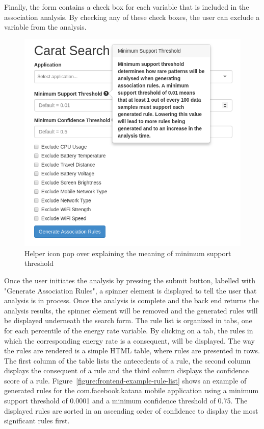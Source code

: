 Finally, the form contains a check box for each variable that is included in the association analysis. By checking any of these check boxes, the user can exclude a variable from the analysis. 

\begin{figure}[!htbp]
	\centering
	\includegraphics[width=\textwidth]{images/frontend/frontend_helper_icons.png}
	\caption{Helper icon pop over explaining the meaning of minimum support threshold}
	\label{figure:frontend-icon-pop-over}
\end{figure}

Once the user initiates the analysis by pressing the submit button, labelled with "Generate Association Rules", a spinner element is displayed to tell the user that analysis is in process. Once the analysis is complete and the back end returns the analysis results, the spinner element will be removed and the generated rules will be displayed underneath the search form. The rule list is organized in tabs, one for each percentile of the energy rate variable. By clicking on a tab, the rules in which the corresponding energy rate is a consequent, will be displayed. The way the rules are rendered is a simple HTML table, where rules are presented in rows. The first column of the table lists the antecedents of a rule, the second column displays the consequent of a rule and the third column displays the confidence score of a rule. Figure~\ref{figure:frontend-example-rule-list} shows an example of generated rules for the com.facebook.katana mobile application using a minimum support threshold of 0.0001 and a minimum confidence threshold of 0.75. The displayed rules are sorted in an ascending order of confidence to display the most significant rules first.      

